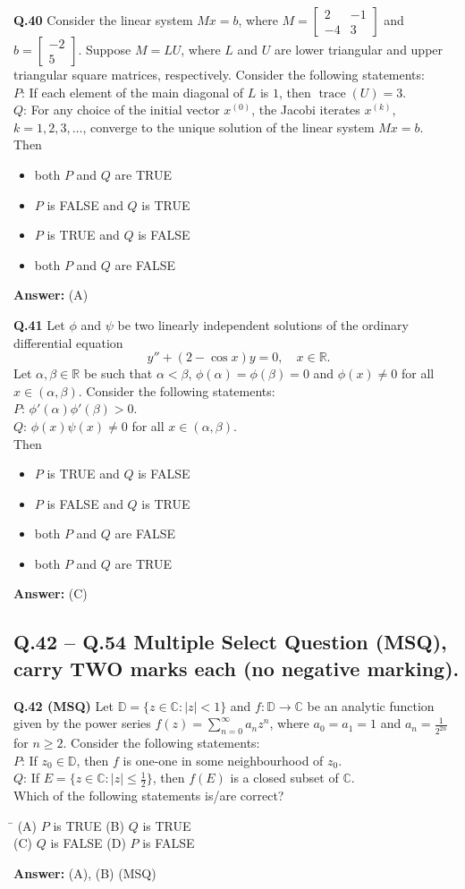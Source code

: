 \documentclass[11pt,a4paper]{article}
\newcommand{\optsfourA}[4]{%
  \begin{tabbing}
    \hspace{0.48\linewidth}\=\kill
    (A) #1 \> (B) #2 \\[2pt]
    (C) #3 \> (D) #4
  \end{tabbing}%
}
\newcommand{\optslistA}[4]{%
  \begin{itemize}
    \setlength{\itemsep}{2pt}\setlength{\parskip}{0pt}
    \item[(A)] #1
    \item[(B)] #2
    \item[(C)] #3
    \item[(D)] #4
  \end{itemize}%
}
\newcommand{\ans}[1]{\textbf{Answer:} #1\par\medskip}
\begin{document}
\textbf{Q.40} Consider the linear system $Mx = b$, where $M = \begin{bmatrix} 2 & -1 \\ -4 & 3 \end{bmatrix}$ and $b = \begin{bmatrix} -2 \\ 5 \end{bmatrix}$. Suppose $M = LU$, where $L$ and $U$ are lower triangular and upper triangular square matrices, respectively. Consider the following statements:\\
$P$: If each element of the main diagonal of $L$ is $1$, then $\operatorname{trace}(U) = 3$.\\
$Q$: For any choice of the initial vector $x^{(0)}$, the Jacobi iterates $x^{(k)}$, $k = 1, 2, 3, \ldots$, converge to the unique solution of the linear system $Mx = b$.\\
Then
\optslistA{both $P$ and $Q$ are TRUE}{$P$ is FALSE and $Q$ is TRUE}{$P$ is TRUE and $Q$ is FALSE}{both $P$ and $Q$ are FALSE}
\ans{(A)}

\textbf{Q.41} Let $\phi$ and $\psi$ be two linearly independent solutions of the ordinary differential equation
\[
  y'' + (2 - \cos x)y = 0, \quad x \in \mathbb{R}.
\]
Let $\alpha, \beta \in \mathbb{R}$ be such that $\alpha < \beta$, $\phi(\alpha) = \phi(\beta) = 0$ and $\phi(x) \ne 0$ for all $x \in (\alpha, \beta)$. Consider the following statements:\\
$P$: $\phi'(\alpha)\phi'(\beta) > 0$.\\
$Q$: $\phi(x)\psi(x) \ne 0$ for all $x \in (\alpha, \beta)$.\\
Then
\optslistA{$P$ is TRUE and $Q$ is FALSE}{$P$ is FALSE and $Q$ is TRUE}{both $P$ and $Q$ are FALSE}{both $P$ and $Q$ are TRUE}
\ans{(C)}

\subsection*{Q.42 -- Q.54 Multiple Select Question (MSQ), carry TWO marks each (no negative marking).}

\textbf{Q.42 (MSQ)} Let $\mathbb{D} = \{z \in \mathbb{C} : |z| < 1\}$ and $f : \mathbb{D} \to \mathbb{C}$ be an analytic function given by the power series $f(z) = \sum_{n=0}^{\infty} a_n z^n$, where $a_0 = a_1 = 1$ and $a_n = \frac{1}{2^{2n}}$ for $n \ge 2$. Consider the following statements:\\
$P$: If $z_0 \in \mathbb{D}$, then $f$ is one-one in some neighbourhood of $z_0$.\\
$Q$: If $E = \{z \in \mathbb{C} : |z| \le \frac{1}{2}\}$, then $f(E)$ is a closed subset of $\mathbb{C}$.\\
Which of the following statements is/are correct?
\optsfourA{$P$ is TRUE}{$Q$ is TRUE}{$Q$ is FALSE}{$P$ is FALSE}
\ans{(A), (B) (MSQ)}
\end{document}
